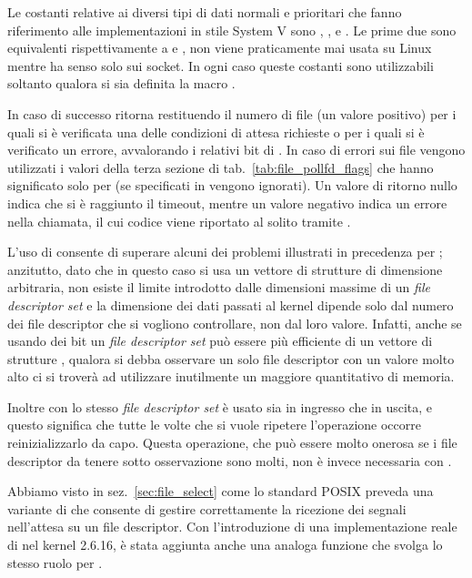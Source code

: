 Le costanti relative ai diversi tipi di dati normali e prioritari che fanno
riferimento alle implementazioni in stile System V sono ,
,  e . Le prime due sono
equivalenti rispettivamente a  e ,
 non viene praticamente mai usata su Linux mentre
 ha senso solo sui socket. In ogni caso queste costanti sono
utilizzabili soltanto qualora si sia definita la macro
.

In caso di successo  ritorna restituendo il numero di file (un
valore positivo) per i quali si è verificata una delle condizioni di attesa
richieste o per i quali si è verificato un errore, avvalorando i relativi bit
di . In caso di errori sui file vengono utilizzati i valori della
terza sezione di tab.~\ref{tab:file_pollfd_flags} che hanno significato solo
per  (se specificati in  vengono ignorati). Un valore
di ritorno nullo indica che si è raggiunto il timeout, mentre un valore
negativo indica un errore nella chiamata, il cui codice viene riportato al
solito tramite .

L'uso di  consente di superare alcuni dei problemi illustrati in
precedenza per ; anzitutto, dato che in questo caso si usa un
vettore di strutture  di dimensione arbitraria, non esiste il
limite introdotto dalle dimensioni massime di un \textit{file descriptor set}
e la dimensione dei dati passati al kernel dipende solo dal numero dei file
descriptor che si vogliono controllare, non dal loro valore. Infatti, anche se
usando dei bit un \textit{file descriptor set} può essere più efficiente di un
vettore di strutture , qualora si debba osservare un solo file
descriptor con un valore molto alto ci si troverà ad utilizzare inutilmente un
maggiore quantitativo di memoria.

Inoltre con  lo stesso \textit{file descriptor set} è usato sia
in ingresso che in uscita, e questo significa che tutte le volte che si vuole
ripetere l'operazione occorre reinizializzarlo da capo. Questa operazione, che
può essere molto onerosa se i file descriptor da tenere sotto osservazione
sono molti, non è invece necessaria con .

Abbiamo visto in sez.~\ref{sec:file_select} come lo standard POSIX preveda una
variante di  che consente di gestire correttamente la ricezione
dei segnali nell'attesa su un file descriptor.  Con l'introduzione di una
implementazione reale di  nel kernel 2.6.16, è stata aggiunta
anche una analoga funzione che svolga lo stesso ruolo per .

